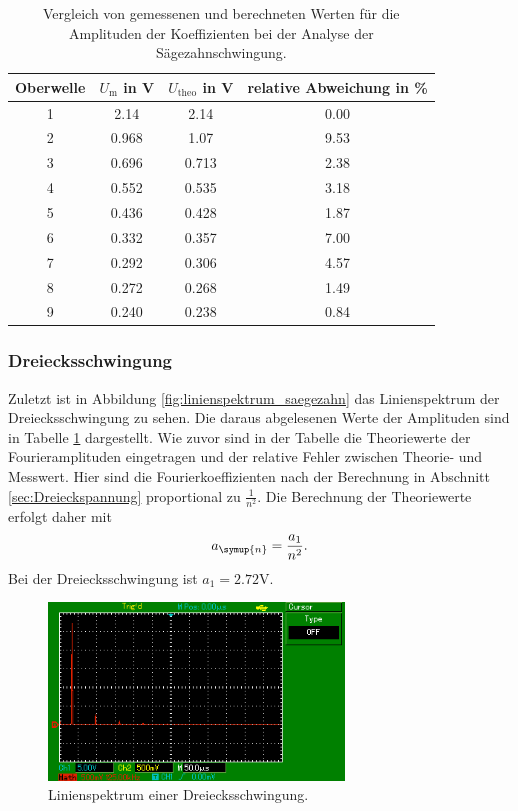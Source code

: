 \begin{table}
  \centering
  \begin{tabular}{c c c c}
    \toprule
    Oberwelle & $U_\text{m}$ in \si{\volt} & $U_\text{theo}$ in \si{\volt} &
    relative Abweichung in \% \\
    \midrule
    1 & 2.14  & 2.14  & 0.00 \\
    2 & 0.968 & 1.07  & 9.53 \\
    3 & 0.696 & 0.713 & 2.38 \\
    4 & 0.552 & 0.535 & 3.18 \\
    5 & 0.436 & 0.428 & 1.87 \\
    6 & 0.332 & 0.357 & 7.00 \\
    7 & 0.292 & 0.306 & 4.57 \\
    8 & 0.272 & 0.268 & 1.49 \\
    9 & 0.240 & 0.238 & 0.84 \\
    \bottomrule
  \end{tabular}
  \caption{Vergleich von gemessenen und berechneten Werten für die Amplituden
    der Koeffizienten bei der Analyse der Sägezahnschwingung.}
  \label{tab:analyse_saegezahn}
\end{table}

\subsubsection{Dreiecksschwingung}
Zuletzt ist in Abbildung \ref{fig:linienspektrum_saegezahn} das Linienspektrum der
Dreiecksschwingung zu sehen. Die daraus abgelesenen Werte der Amplituden sind in
Tabelle \ref{tab:analyse_saegezahn} dargestellt. Wie zuvor sind in der Tabelle
die Theoriewerte der Fourieramplituden eingetragen und der relative Fehler
zwischen Theorie- und Messwert.
Hier sind die Fourierkoeffizienten nach der Berechnung in Abschnitt \ref{sec:Dreieckspannung}
proportional zu $\frac{1}{n^2}$. Die Berechnung der Theoriewerte erfolgt daher mit
\begin{equation}
  a_\symup{n} = \frac{a_1}{n^2}.
  \label{eqn:a_n_dreieck}
\end{equation}
Bei der Dreiecksschwingung ist $a_1 = 2.72 \si{\volt}$.

\begin{figure}
  \centering
  \includegraphics[width=0.7\textwidth]{linienspektrum_dreieck.png}
  \caption{Linienspektrum einer Dreiecksschwingung.}
  \label{fig:linienspektrum_dreieck}
\end{figure}

